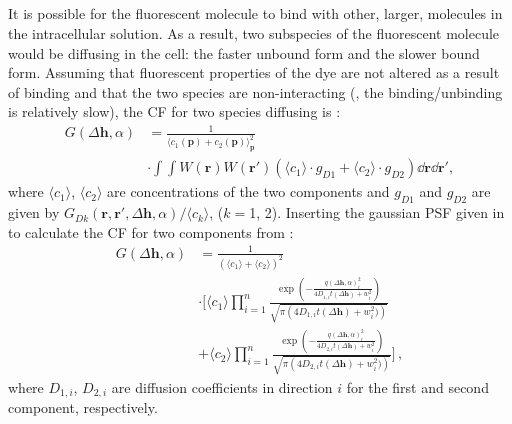 \subsection{}
It is possible for the fluorescent molecule to bind with other, larger, molecules
in the intracellular solution. As a result, two subspecies of
the fluorescent molecule would be diffusing in the cell: the faster unbound form
and the slower bound form. Assuming that fluorescent properties of the
dye are not altered as a result of binding and that the two species are
non-interacting (\ie, the binding/unbinding is relatively slow),
the \ac{CF} for two species diffusing is \citep{Lakowicz_06_Springer,Krichevsky_02_ReportsonProgPhys_65_p251} :
\begin{align}
G(\Delta \mathbf{h},\alpha)&=\frac{1}{\langle
c_1(\mathbf{p})+c_2(\mathbf{p})\rangle_{\mathbf{p}}^2}\nonumber\\
&\cdot\int\!\!\int
W(\mathbf{r})W(\mathbf{r'})
\left(
\langle c_1 \rangle \cdot g_{D1}
+
\langle c_2 \rangle \cdot g_{D2}
\right)
\dd \mathbf{r}\dd \mathbf{r'},
\label{eq:G_2c}
\end{align}
where $\langle c_1 \rangle$, $\langle c_2 \rangle$ are concentrations of
the two components and $g_{D1}$ and $g_{D2}$ are given by
$G_{Dk}(\mathbf{r},\mathbf{r'},\Delta \mathbf{h},\alpha) / \langle c_k
\rangle$, ($k=$1, 2).
Inserting the gaussian \ac{PSF} given in \Eq{~\ref{eq:PSF_def}} to calculate the \ac{CF} for two
components from \Eq{~\ref{eq:G_2c}}:
\begin{align*}
  G(\Delta \mathbf{h},\alpha) &= \frac{1}{\left(\langle c_1 \rangle+
  \langle c_2 \rangle\right)^2}\\
  &\cdot\bigg[\langle c_1 \rangle\prod_{i=1}^n
  \frac{
  \exp\left(-\frac{q(\Delta \mathbf{h},\alpha)_i^2}
  {4D_{1,i}t(\Delta \mathbf{h})+w_i^2}\right)
  }{\sqrt{\pi\left(4D_{1,i}t(\Delta \mathbf{h})+w_i^2)\right)}}\\
  &+\langle c_2 \rangle\prod_{i=1}^n
  \frac{
  \exp\left(-\frac{q(\Delta \mathbf{h},\alpha)_i^2}
  {4D_{2,i}t(\Delta \mathbf{h})+w_i^2}\right)
  }{\sqrt{\pi\left(4D_{2,i}t(\Delta \mathbf{h})+w_i^2)\right)}}\bigg]
  \,,
  \label{eq:G_alpha}
\end{align*}
where $D_{1,i}$, $D_{2,i}$  are diffusion coefficients in direction $i$ for the first and second component,
respectively. 

